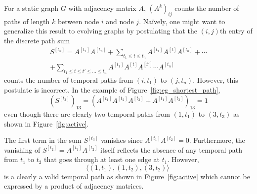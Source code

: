 \documentclass[10pt,conference,compsocconf]{IEEEtran}
\theoremstyle{definition}
\begin{document}
For a static graph $G$ with adjacency matrix $A$, $(A^k)_{ij}$ counts the number
of paths of length $k$ between node $i$ and node $j$. Na\"ively, one might want
to generalize this result to evolving graphs by postulating that the $(i,j)$th
entry of the discrete path sum
\begin{align}
S^{[t_n]} = A^{[t_1]}A^{[t_n]} + \sum_{t_1 \le t \le t_n} A^{[t_1]}A^{[t]}A^{[t_n]}
+ \cdots \nonumber \\
+ \sum_{t_1 \le t \le t' \le \dots \le t_n}
A^{[t_1]}A^{[t]}A^{[t']}\cdots A^{[t_n]}
\label{eq:sum}
\end{align}
counts the number of temporal paths from $(i,t_1)$ to $(j,t_n)$.
However, this postulate is incorrect.
In the example of Figure~\ref{fig:eg_shortest_path},
\[
(S^{[t_3]})_{13} = \left(A^{[t_1]}A^{[t_2]}A^{[t_3]} + A^{[t_1]}A^{[t_3]}\right)_{13} = 1
\]
even though there are clearly two temporal paths from
$(1, t_1)$ to $(3, t_3)$ as shown in Figure~\ref{fig:active}.

The first term in the sum $S^{[t_3]}$ vanishes since $A^{[t_1]}A^{[t_2]} = 0$.
Furthermore, the vanishing of $S^{[t_2]} = A^{[t_1]}A^{[t_2]}$ itself reflects the absence of any temporal path
from $t_1$ to $t_2$ that goes through at least one edge at $t_1$. However,
\begin{equation}
\langle(1, t_1), (1, t_2), (3, t_2)\rangle~\label{eq:tpathex}
\end{equation}
is a clearly a valid temporal path as shown in Figure~\ref{fig:active} which
cannot be expressed by a product of adjacency matrices.
\end{document}
